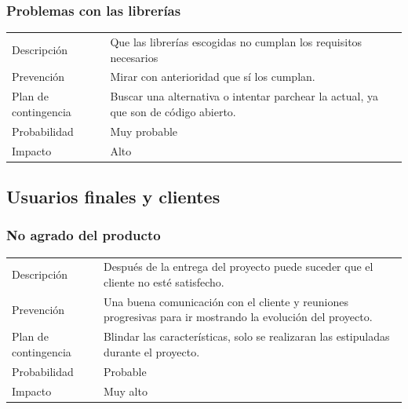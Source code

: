 \subsubsection{Problemas con las librer\'{i}as}
\begin{table}[H]
    \begin{center}
        \begin{tabular}{l p{8cm}}
            Descripci\'{o}n                 & Que las librer\'{i}as escogidas no cumplan los requisitos necesarios \\
            Prevenci\'{o}n                  & Mirar con anterioridad que s\'i los cumplan. \\ 
            Plan de contingencia            & Buscar una alternativa o intentar parchear la actual, ya que son de c\'{o}digo 
            								  abierto. \\
            Probabilidad                    & Muy probable \\
            Impacto                         & Alto \\
        \end{tabular}
    \end{center}
    
\end{table}
\subsection{Usuarios finales y clientes}
\subsubsection{No agrado del producto}
\begin{table}[H]
    \begin{center}
        \begin{tabular}{l p{8cm}}
            Descripci\'{o}n                 & Despu\'{e}s de la entrega del proyecto puede suceder que el cliente no est\'{e} 
            								  satisfecho. \\
            Prevenci\'{o}n                  & Una buena comunicación con el cliente y reuniones progresivas para ir mostrando la 
            								  evolución del proyecto. \\ 
            Plan de contingencia            & Blindar las caracter\'{i}sticas, solo se realizaran las estipuladas durante el 
            							   	  proyecto. \\
            Probabilidad                    & Probable \\
            Impacto                         & Muy alto \\
        \end{tabular}
    \end{center}
    
\end{table}

